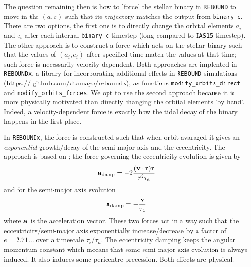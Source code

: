 \documentclass[ twoside,openright,titlepage,numbers=noenddot,headinclude,%
                footinclude=true,cleardoublepage=empty,abstractoff, %
                BCOR=5mm,paper=a4,fontsize=11pt,%
                american,%
                ]{scrreprt}
\begin{document}
The question remaining then is how to 'force' the stellar binary in \texttt{REBOUND}
to move in the $(a,e)$ such that its trajectory matches the output from 
\texttt{binary\_c}. There are two options, the first one is to directly change 
the orbital elements $a_i$ and $e_i$ after each internal \texttt{binary\_c} timestep
(long compared to \texttt{IAS15} timestep). The other approach is to construct 
a force which acts on the stellar binary such that the values of $(a_i,e_i)$ after
specified time match the  values at that time; such force is 
necessarily velocity-dependent. Both approaches
are implented in \texttt{REBOUNDx}, a library for incorporating additional effects
in \texttt{REBOUND} simulations (\url{https:// github.com/dtamayo/reboundx}), as
functions \texttt{modify\_orbits\_direct} and \texttt{modify\_orbits\_forces}. We opt
to use the second approach because it is more physically motivated than directly 
changing the orbital elements 'by hand'. Indeed, a velocity-dependent force
 is exactly how the tidal decay of the binary happens in the first place.

In \texttt{REBOUNDx}, the force is constructed such that when orbit-avaraged it
gives an \emph{exponential} growth/decay of the semi-major axis and the
eccentricity. The approach is based on \cite{papaloizou}; the force governing 
the eccentricity evolution is given by
\begin{equation}
    \boldsymbol{\mathbf{a}}_\text{damp}=-2 \frac{(\boldsymbol{\mathbf{v}}\cdot\boldsymbol{\mathbf{r}})\boldsymbol{\mathbf{r}}}{r^2 \tau_e }
\end{equation}
and for the semi-major axis evolution
\begin{equation}
    \boldsymbol{\mathbf{a}}_\text{damp}=- \frac{\boldsymbol{\mathbf{v}}}{\tau_a} 
\end{equation}
where $\boldsymbol{\mathbf{a}}$ is the acceleration vector. These two forces act in a way such
that the eccentricity/semi-major axis exponentially increase/decrease by a factor
of $e=2.71\dots$ over a timescale $\tau_e$/$\tau_a$. The eccentricity damping
keeps the angular momentum constant which meeans that some semi-major axis 
evolution is always induced. It also induces some pericentre precession. Both
effects are physical. 
\end{document}
